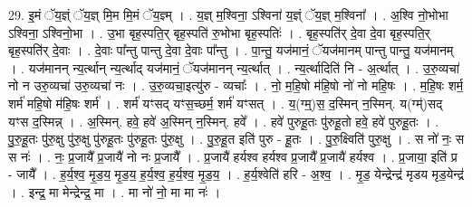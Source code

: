 \documentclass[17pt]{extarticle}
\begin{document}
29. इ॒मं ॅय॒ज्ञ्ं ॅय॒ज्ञ् मि॒म मि॒मं ॅय॒ज्ञ्म् । . य॒ज्ञ् म॒श्विना॒ ऽश्विना॑ य॒ज्ञ्ं ॅय॒ज्ञ् म॒श्विना᳚ । . अ॒श्वि नो॒भोभा ऽश्विना॒ ऽश्विनो॒भा । . उ॒भा बृह॒स्पति॒र् बृह॒स्पति॑ रु॒भोभा बृह॒स्पतिः॑ । . बृह॒स्पति॑र् दे॒वा दे॒वा बृह॒स्पति॒र् बृह॒स्पति॑र् दे॒वाः । . दे॒वाः पा᳚न्तु पान्तु दे॒वा दे॒वाः पा᳚न्तु । . पा॒न्तु॒ यज॑मानं॒ ॅयज॑मानम् पान्तु पान्तु॒ यज॑मानम् । . यज॑मानन् न्य॒र्त्थान् न्य॒र्त्थाद् यज॑मानं॒ ॅयज॑मानन् न्य॒र्त्थात् । . न्य॒र्त्थादिति॑ नि - अ॒र्त्थात् । . उ॒रु॒व्यचा॑ नो न उरु॒व्यचा॑ उरु॒व्यचा॑ नः । . उ॒रु॒व्यचा॒इत्यु॑रु - व्यचाः᳚ । . नो॒ म॒हि॒षो म॑हि॒षो नो॑ नो महि॒षः । . म॒हि॒षः शर्म॒ शर्म॑ महि॒षो म॑हि॒षः शर्म॑ । . शर्म॑ यꣳसद् यꣳस॒च्छर्म॒ शर्म॑ यꣳसत् । . य॒(ग्म्॒)स॒ द॒स्मिन् न॒स्मिन्. य(ग्म्॑)सद् यꣳस द॒स्मिन्न् । . अ॒स्मिन्. हवे॒ हवे॑ अ॒स्मिन् न॒स्मिन्. हवे᳚ । . हवे॑ पुरुहू॒तः पु॑रुहू॒तो हवे॒ हवे॑ पुरुहू॒तः । . पु॒रु॒हू॒तः पु॑रु॒क्षु पु॑रु॒क्षु पु॑रुहू॒तः पु॑रुहू॒तः पु॑रु॒क्षु । . पु॒रु॒हू॒त इति॑ पुरु - हू॒तः । . पु॒रु॒क्ष्विति॑ पुरु॒क्षु । . स नो॑ नः॒ स स नः॑ । . नः॒ प्र॒जायै᳚ प्र॒जायै॑ नो नः प्र॒जायै᳚ । . प्र॒जायै॑ हर्यश्व हर्यश्व प्र॒जायै᳚ प्र॒जायै॑ हर्यश्व । . प्र॒जाया॒ इति॑ प्र - जायै᳚ । . ह॒र्य॒श्व॒ मृ॒ड॒य॒ मृ॒ड॒य॒ ह॒र्य॒श्व॒ ह॒र्य॒श्व॒ मृ॒ड॒य॒ । . ह॒र्य॒श्वेति॑ हरि - अ॒श्व॒ । . मृ॒ड॒ येन्द्रेन्द्र॑ मृडय मृड॒येन्द्र॑ । . इन्द्र॒ मा मेन्द्रेन्द्र॒ मा । . मा नो॑ नो॒ मा मा नः॑ । \newline
\end{document}
